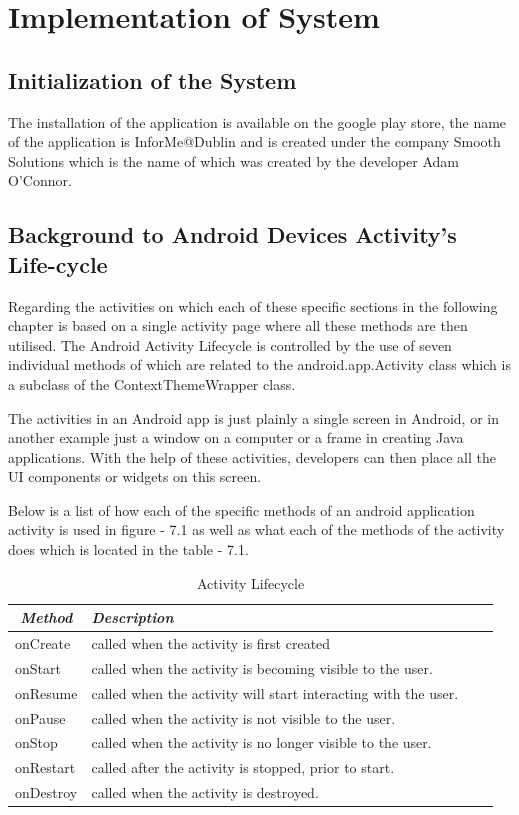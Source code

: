 \chapter{Implementation of System}

\section{Initialization of the System}
The installation of the application is available on the google play store, the name of the application is InforMe@Dublin and is created under the company Smooth Solutions which is the name of which was created by the developer Adam O'Connor.

\section{Background to Android Devices Activity's Life-cycle} 

Regarding the activities on which each of these specific sections in the following chapter is based on a single activity page where all these methods are then utilised. The Android Activity Lifecycle is controlled by the use of seven individual methods of which are related to the android.app.Activity class which is a subclass of the ContextThemeWrapper class.

The activities in an Android app is just plainly a single screen in Android, or in another example just a window on a computer or a frame in creating Java applications. With the help of these activities, developers can then place all the UI components or widgets on this screen.

Below is a list of how each of the specific methods of an android application activity is used in figure - 7.1 as well as what each of the methods of the activity does which is located in the table - 7.1.

\begin{table}[!ht]
    \centering
    \caption{Activity Lifecycle}
    \label{Activity Lifecycle}
    \begin{tabular}{@{}llrl@{}}
        \toprule
        \multicolumn{1}{c}{\textit{Method}} & \textit{Description}\\ \midrule
        onCreate & called when the activity is first created \\ \midrule
         onStart & called when the activity is becoming visible to the user. \\ \midrule
         onResume & called when the activity will start interacting with the user. \\ \midrule
         onPause & called when the activity is not visible to the user. \\ \midrule
         onStop & called when the activity is no longer visible to the user. \\ \midrule
         onRestart & called after the activity is stopped, prior to start. \\ \midrule
         onDestroy & called when the activity is destroyed. \\ \bottomrule
    \end{tabular}
\end{table}

